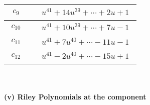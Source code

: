 \documentclass[1p]{elsarticle_modified}
\theoremstyle{definition}
\begin{document}
\begin{tabular}{m{50pt}|m{274pt}}
\hline $$\begin{aligned}c_{9}\end{aligned}$$&$\begin{aligned}
&u^{41}+14 u^{39}+\cdots+2 u+1
\end{aligned}$\\
\hline $$\begin{aligned}c_{10}\end{aligned}$$&$\begin{aligned}
&u^{41}+10 u^{39}+\cdots+7 u-1
\end{aligned}$\\
\hline $$\begin{aligned}c_{11}\end{aligned}$$&$\begin{aligned}
&u^{41}+7 u^{40}+\cdots-11 u-1
\end{aligned}$\\
\hline $$\begin{aligned}c_{12}\end{aligned}$$&$\begin{aligned}
&u^{41}-2 u^{40}+\cdots-15 u+1
\end{aligned}$\\
\hline
\end{tabular}\\~\\
\newpage\renewcommand{\arraystretch}{1}
\flushleft \textbf{(v) Riley Polynomials at the component}\newline \\
\end{document}
